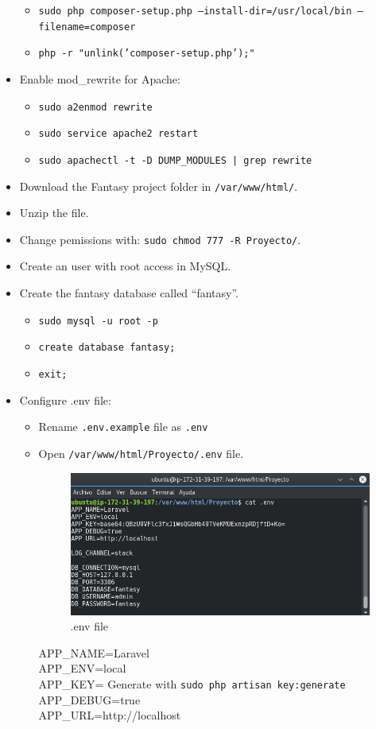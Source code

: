 \begin{itemize}
\begin{itemize}
		\item \texttt{sudo php composer-setup.php --install-dir=/usr/local/bin --filename=composer}
		\item \texttt{php -r "unlink('composer-setup.php');"}
	\end{itemize}
	\item Enable mod\_rewrite for Apache:
	\begin{itemize}
		\item \texttt{sudo a2enmod rewrite}
		\item \texttt{sudo service apache2 restart}
		\item \texttt{sudo apachectl -t -D DUMP\_MODULES | grep rewrite}
	\end{itemize}
	\item Download the Fantasy project folder in \texttt{/var/www/html/}.
	\item Unzip the file.
	\item Change pemissions with: \texttt{sudo chmod 777 -R Proyecto/}.
	\item Create an user with root access in MySQL.
	\item Create the fantasy database called ``fantasy''.
	\begin{itemize}
		\item \texttt{sudo mysql -u root -p}
		\newpage
		\item \texttt{create database fantasy;}
		\item \texttt{exit;}
	\end{itemize}
	\item Configure .env file:
	\begin{itemize}
		\item Rename \texttt{.env.example} file as \texttt{.env}
		\item Open \texttt{/var/www/html/Proyecto/.env} file.
		\begin{figure}[h]
			\centering
			\includegraphics[scale=0.5]{Epilogue/env.png}
			\caption{.env file}
			\label{env file}
		\end{figure}
		APP\_NAME=Laravel\\
		APP\_ENV=local\\
		APP\_KEY= Generate with \texttt{sudo php artisan key:generate}\\
		APP\_DEBUG=true\\
		APP\_URL=http://localhost\\
		

\end{itemize}
\end{itemize}
